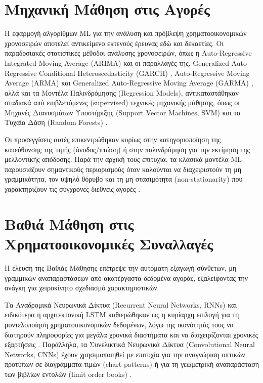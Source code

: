 \section{Μηχανική Μάθηση στις Αγορές}
Η εφαρμογή αλγορίθμων ML για την ανάλυση και πρόβλεψη χρηματοοικονομικών χρονοσειρών 
αποτελεί αντικείμενο εκτενούς έρευνας εδώ και δεκαετίες. Οι παραδοσιακές στατιστικές 
μέθοδοι ανάλυσης χρονοσειρών, όπως η Auto-Regressive Integrated Moving Average (ARIMA) 
\cite{boxjenkins1976} και οι παραλλαγές της, Generalized Auto-Regressive Conditional 
Heteroscedasticity (GARCH) \cite{engle1982arch, bollerslev1986garch}, Auto-Regressive Moving 
Average (ARMA) και Generalized Auto-Regressive Moving Average (GARMA) 
\cite{boxjenkins1976, benjamin2003generalized, zheng2022generalized}, 
αλλά και τα Μοντέλα Παλινδρόμησης (Regression Models), αντικαταστάθηκαν σταδιακά από 
επιβλεπόμενες (supervised) τεχνικές μηχανικής μάθησης, όπως οι Μηχανές Διανυσμάτων Υποστήριξης 
(Support Vector Machines, SVM) και τα Τυχαία Δάση (Random Forests) \cite{patel2015}.

Οι προσεγγίσεις αυτές επικεντρώθηκαν κυρίως στην κατηγοριοποίηση της κατεύθυνσης της τιμής 
(άνοδος/πτώση) ή στην παλινδρόμηση για την εκτίμηση της μελλοντικής απόδοσης. 
Παρά την αρχική τους επιτυχία, τα κλασικά μοντέλα ML παρουσιάζουν σημαντικούς περιορισμούς 
όταν καλούνται να διαχειριστούν τη μη γραμμικότητα, τον υψηλό θόρυβο και τη μη στασιμότητα 
(non-stationarity) που χαρακτηρίζουν τις σύγχρονες διεθνείς αγορές \cite{lopezdeprado2018, hambly2023rlfinance}.

\section{Βαθιά Μάθηση στις Χρηματοοικονομικές Συναλλαγές}
Η έλευση της Βαθιάς Μάθησης επέτρεψε την αυτόματη εξαγωγή σύνθετων, μη γραμμικών αναπαραστάσεων 
από ακατέργαστα δεδομένα αγοράς, εξαλείφοντας την ανάγκη για χειροκίνητο σχεδιασμό χαρακτηριστικών. 

Τα Αναδρομικά Νευρωνικά Δίκτυα (Recurrent Neural Networks, RNNs) και ειδικότερα η αρχιτεκτονική 
LSTM καθιερώθηκαν ως η κυρίαρχη επιλογή για τη μοντελοποίηση χρηματοοικονομικών δεδομένων, 
λόγω της ικανότητάς τους να διατηρούν πληροφορίες για μεγάλα χρονικά διαστήματα και να 
διαχειρίζονται χρονικές εξαρτήσεις \cite{fischer2018lstm}. Παράλληλα, τα Συνελικτικά Νευρωνικά Δίκτυα 
(Convolutional Neural Networks, CNNs) έχουν χρησιμοποιηθεί με επιτυχία για την αναγνώριση 
οπτικών προτύπων σε διαγράμματα τιμών (chart patterns) \cite{sezer2018cnn} ή για τη γεωμετρική αναπαράσταση των
βιβλίων εντολών (limit order books) \cite{zhang2019deeplob}. 


